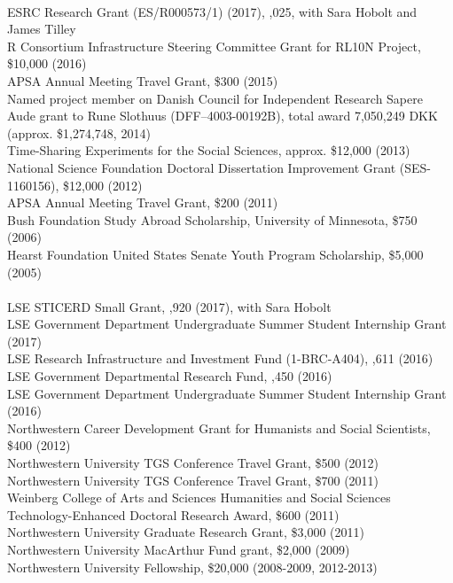 \documentclass[12pt]{article}
\renewcommand{\section}[1]{\pagebreak[3]%
    \llap{\scshape\smash{\parbox[t]{\marginparwidth}{\raggedright {\color{lg}#1}}}}%
    \vspace{-\baselineskip}\par}
\newcommand{\topic}[1]{\pagebreak[3]\indent {\color{lg}{\footnotesize #1 }}\\}
\newcommand{\entry}[1]{\indent {\color{lg}\guillemotright}\hspace{2pt}#1\vspace{.25em}\\}
\begin{document}
\section{Grants \&\\Funding}
\topic{External Sources}
	\entry{ESRC Research Grant (ES/R000573/1) (2017), ,025, with Sara Hobolt and James Tilley}
    \entry{R Consortium Infrastructure Steering Committee Grant for RL10N Project, \$10,000 (2016)}
	\entry{APSA Annual Meeting Travel Grant, \$300 (2015)}
	\entry{Named project member on Danish Council for Independent Research Sapere Aude grant to Rune Slothuus (DFF--4003-00192B), total award 7,050,249 DKK (approx. \$1,274,748, 2014)}
	\entry{Time-Sharing Experiments for the Social Sciences, approx. \$12,000 (2013)}
	\entry{National Science Foundation Doctoral Dissertation Improvement Grant (SES-1160156), \$12,000 (2012)}
	\entry{APSA Annual Meeting Travel Grant, \$200 (2011)}
	\entry{Bush Foundation Study Abroad Scholarship, University of Minnesota, \$750 (2006)}
	\entry{Hearst Foundation United States Senate Youth Program Scholarship, \$5,000 (2005)}
	
	\topic{Institutional Sources}
	\entry{LSE STICERD Small Grant, ,920 (2017), with Sara Hobolt}
    \entry{LSE Government Department Undergraduate Summer Student Internship Grant (2017)}
    \entry{LSE Research Infrastructure and Investment Fund (1-BRC-A404), \textsterling 11,611 (2016)}
	\entry{LSE Government Departmental Research Fund, ,450 (2016)}
	\entry{LSE Government Department Undergraduate Summer Student Internship Grant (2016)}
	\entry{Northwestern Career Development Grant for Humanists and Social Scientists, \$400 (2012)}
	\entry{Northwestern University TGS Conference Travel Grant, \$500 (2012)}
	\entry{Northwestern University TGS Conference Travel Grant, \$700 (2011)}
	\entry{Weinberg College of Arts and Sciences Humanities and Social Sciences Technology-Enhanced Doctoral Research Award, \$600 (2011)}
	\entry{Northwestern University Graduate Research Grant, \$3,000 (2011)}
	\entry{Northwestern University MacArthur Fund grant, \$2,000 (2009)}
	\entry{Northwestern University Fellowship, \$20,000 (2008-2009, 2012-2013)}
\end{document}
